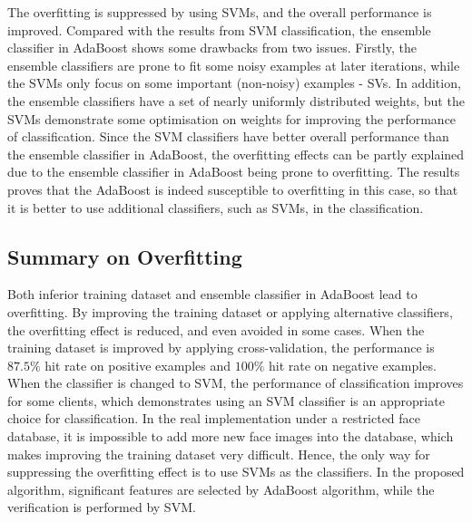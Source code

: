 The overfitting is suppressed by using SVMs, and the overall performance is improved. Compared with the results from SVM classification, the ensemble classifier in AdaBoost shows some drawbacks from two issues. Firstly, the ensemble classifiers are prone to fit some noisy examples at later iterations, while the SVMs only focus on some important (non-noisy) examples - SVs. In addition, the ensemble classifiers have a set of nearly uniformly distributed weights, but the SVMs demonstrate some optimisation on weights for improving the performance of classification.
Since the SVM classifiers have better overall performance than the ensemble classifier in AdaBoost, the overfitting effects can be partly explained due to the ensemble classifier in AdaBoost being prone to overfitting. The results proves that the AdaBoost is indeed susceptible to overfitting in this case, so that it is better to use additional classifiers, such as SVMs, in the classification.

\subsection{Summary on Overfitting}
Both inferior training dataset and ensemble classifier in AdaBoost lead to overfitting. By improving the training dataset or applying alternative classifiers, the overfitting effect is reduced, and even avoided in some cases. When the training dataset is improved by applying cross-validation, the performance is $87.5\%$ hit rate on positive examples and $100\%$ hit rate on negative examples. When the classifier is changed to SVM, the performance of classification improves for some clients, which demonstrates using an SVM classifier is an appropriate choice for classification. In the real implementation under a restricted face database, it is impossible to add more new face images into the database, which makes improving the training dataset very difficult. Hence, the only way for suppressing the overfitting effect is to use SVMs as the classifiers. In the proposed algorithm, significant features are selected by AdaBoost algorithm, while the verification is performed by SVM.

